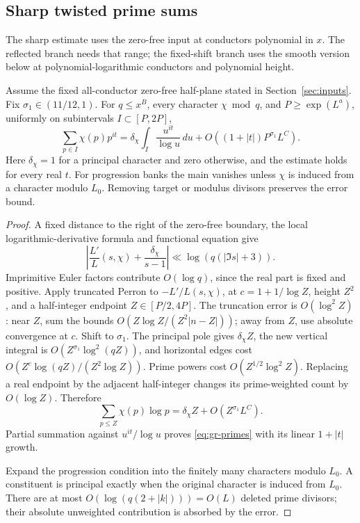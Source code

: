 \subsection{Sharp twisted prime sums}


The sharp estimate uses the zero-free input at conductors polynomial
in \(x\). The reflected branch needs that range; the fixed-shift
branch uses the smooth version below at polynomial-logarithmic
conductors and polynomial height.

\begin{lemma}\label{lem:gr-primes}
Assume the fixed all-conductor zero-free half-plane stated in
Section~\ref{sec:inputs}.
Fix \(\sigma_1\in(11/12,1)\).
For \(q\le x^B\), every character \(\chi\bmod q\), and
\(P\ge\exp(L^a)\), uniformly on subintervals \(I\subset[P,2P]\),
\begin{equation}
 \sum_{p\in I}\chi(p)p^{it}
 =\delta_\chi\int_I\frac{u^{it}}{\log u}\,du
       +O((1+|t|)P^{\sigma_1}L^C).                  \label{eq:gr-primes}
\end{equation}
Here \(\delta_\chi=1\) for a principal character and zero otherwise,
and the estimate holds for every real \(t\).
For progression banks the main vanishes unless \(\chi\) is induced
from a character modulo \(L_0\).
Removing target or modulus divisors preserves the error bound.
\end{lemma}

\begin{proof}
A fixed distance to the right of the zero-free boundary, the local
logarithmic-derivative formula and functional equation give
\begin{equation}
 \left|\frac{L'}{L}(s,\chi)+\frac{\delta_\chi}{s-1}\right|
                 \ll \log(q(|\Im s|+3)).
 \label{eq:gr-logderivative}
\end{equation}
Imprimitive Euler factors contribute \(O(\log q)\), since the real
part is fixed and positive.
Apply truncated Perron to
\(-L'/L(s,\chi)\), at
\(c=1+1/\log Z\), height \(Z^2\), and a half-integer endpoint
\(Z\in[P/2,4P]\).
The truncation error is \(O(\log^2 Z)\): near \(Z\), sum the bounds
\(O(Z\log Z/(Z^2|n-Z|))\); away from \(Z\), use absolute convergence
at \(c\).  Shift to \(\sigma_1\).
The principal pole gives \(\delta_\chi Z\), the new vertical integral
is \(O(Z^{\sigma_1}\log^2(qZ))\), and horizontal edges cost
\(O(Z^c\log(qZ)/(Z^2\log Z))\).
Prime powers cost \(O(Z^{1/2}\log^2 Z)\).
Replacing a real endpoint by the adjacent half-integer changes its
prime-weighted count by \(O(\log Z)\).  Therefore
\[
       \sum_{p\le Z}\chi(p)\log p
          =\delta_\chi Z+O(Z^{\sigma_1}L^C).
\]
Partial summation against \(u^{it}/\log u\) proves
\eqref{eq:gr-primes} with its linear \(1+|t|\) growth.

Expand the progression condition into the finitely many characters
modulo \(L_0\).  A constituent is principal exactly when the original
character is induced from \(L_0\).
There are at most \(O(\log(q(2+|k|)))=O(L)\) deleted prime divisors;
their absolute unweighted contribution is absorbed by the error.
\end{proof}

